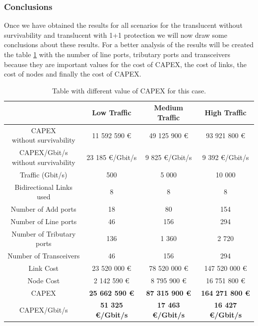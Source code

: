 \vspace{13pt}
\subsubsection{Conclusions}

Once we have obtained the results for all scenarios for the translucent without survivability and translucent with 1+1 protection we will now draw some conclusions about these results. For a better analysis of the results will be created the table \ref{table_comparative_transl_protec_heuristic} with the number of line ports, tributary ports and transceivers because they are important values for the cost of CAPEX, the cost of links, the cost of nodes and finally the cost of CAPEX.\\

\begin{table}[H]
\centering
\begin{tabular}{| c | c | c | c |}
 \hline
 & Low Traffic & Medium Traffic & High Traffic \\
 \hline\hline
 \makecell{CAPEX \\ without survivability} & 11 592 590 \euro & 49 125 900 \euro & 93 921 800 \euro \\ \hline
 \makecell{CAPEX/Gbit/s \\ without survivability} & 23 185 \euro/Gbit/s & 9 825 \euro/Gbit/s & 9 392 \euro/Gbit/s \\ \hline
 Traffic (Gbit/s) & 500 & 5 000 & 10 000 \\ \hline
 Bidirectional Links used & 8 & 8 & 8 \\ \hline
 Number of Add ports & 18 & 80 & 154 \\ \hline
 Number of Line ports & 46 & 156 & 294 \\ \hline
 Number of Tributary ports & 136 & 1 360 & 2 720 \\ \hline
 Number of Transceivers & 46 & 156 & 294 \\ \hline
 Link Cost & 23 520 000 \euro & 78 520 000 \euro & 147 520 000 \euro \\ \hline
 Node Cost & 2 142 590 \euro & 8 795 900 \euro & 16 751 800 \euro \\ \hline
 CAPEX & \textbf{25 662 590 \euro} & \textbf{87 315 900 \euro} & \textbf{164 271 800 \euro} \\ \hline
 CAPEX/Gbit/s & \textbf{51 325 \euro/Gbit/s} & \textbf{17 463 \euro/Gbit/s} & \textbf{16 427 \euro/Gbit/s} \\ \hline
\end{tabular}
\caption{Table with different value of CAPEX for this case.}
\label{table_comparative_transl_protec_heuristic}
\end{table}

